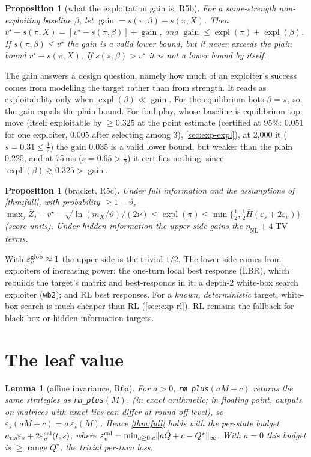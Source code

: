 \documentclass[10pt]{article}
\theoremstyle{plain}
\newtheorem{lemma}[theorem]{Lemma}
\newtheorem{proposition}[theorem]{Proposition}
\theoremstyle{definition}
\theoremstyle{remark}
\newcommand{\Hbar}{\bar H}
\newcommand{\epss}{\varepsilon_s}
\newcommand{\epsv}{\varepsilon_v}
\newcommand{\etaNL}{\eta_{\mathrm{NL}}}
\newcommand{\Qhat}{\hat Q}
\newcommand{\Qstar}{Q^\star}
\DeclareMathOperator{\expl}{expl}
\DeclareMathOperator{\TV}{TV}
\DeclareMathOperator{\range}{range}
\DeclareMathOperator{\gain}{gain}
\begin{document}
\begin{proposition}[what the exploitation gain is, R5b]\label{prop:R5b}
For a same-strength non-exploiting baseline $\beta$, let $\gain=s(\pi,\beta)-s(\pi,X)$. Then $v^\star-s(\pi,X)=[v^\star-s(\pi,\beta)]+\gain$, and $\gain\le\expl(\pi)+\expl(\beta)$. If $s(\pi,\beta)\le v^\star$ the gain is a valid lower bound, but it never exceeds the plain bound $v^\star-s(\pi,X)$. If $s(\pi,\beta)>v^\star$ it is not a lower bound by itself.
\end{proposition}
The gain answers a design question, namely how much of an exploiter's success comes from modelling the target rather than from strength. It reads as exploitability only when $\expl(\beta)\ll\gain$. For the equilibrium bots $\beta=\pi$, so the gain equals the plain bound. For foul-play, whose baseline is equilibrium top move (itself exploitable by $\ge0.325$ at the point estimate (certified at 95\%: 0.051 for one exploiter, 0.005 after selecting among 3), \cref{sec:exp-expl}), at 2,000 it ($s=0.31\le\frac12$) the gain 0.035 is a valid lower bound, but weaker than the plain 0.225, and at 75\,ms ($s=0.65>\frac12$) it certifies nothing, since $\expl(\beta)\gtrsim0.325>\gain$.

\begin{proposition}[bracket, R5c]\label{prop:R5c}
Under full information and the assumptions of \cref{thm:full}, with probability $\ge1-\vartheta$,
$\max_j\bar Z_j-v^\star-\sqrt{\ln(m_X/\vartheta)/(2\nu)}\le\expl(\pi)\le\min\{\tfrac12,\tfrac12\Hbar(\epss+2\epsv)\}$ (score units). Under hidden information the upper side gains the $\etaNL+4\TV$ terms.
\end{proposition}
With $\epsv^{\rm glob}\approx1$ the upper side is the trivial $1/2$. The lower side comes from exploiters of increasing power: the one-turn local best response (LBR), which rebuilds the target's matrix and best-responds in it; a depth-2 white-box search exploiter (\texttt{wb2}); and RL best responses. For a \emph{known, deterministic} target, white-box search is much cheaper than RL (\cref{sec:exp-rl}). RL remains the fallback for black-box or hidden-information targets.

\section{The leaf value}
\label{sec:leaf}
\begin{lemma}[affine invariance, R6a]\label{lem:R6a}
For $a>0$, \texttt{rm\_plus}$(aM+c)$ returns the same strategies as \texttt{rm\_plus}$(M)$, (in exact arithmetic; in floating point, outputs on matrices with exact ties can differ at round-off level), so $\epss(aM+c)=a\,\epss(M)$. Hence \cref{thm:full} holds with the per-state budget $a_{t,s}\epss+2\epsv^{\rm cal}(t,s)$, where $\epsv^{\rm cal}=\min_{a\ge0,c}\lVert a\Qhat+c-\Qstar\rVert_\infty$. With $a=0$ this budget is $\ge\range\Qstar$, the trivial per-turn loss.
\end{lemma}
\end{document}
